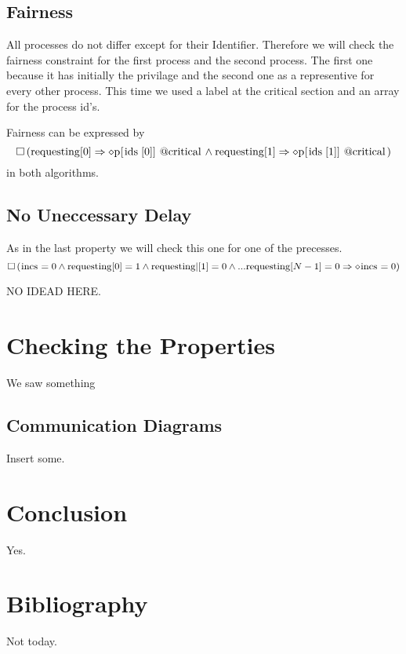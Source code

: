 \documentclass{llncs}
\begin{document}
\subsection{Fairness}

All processes do not differ except for their Identifier. Therefore we will check the fairness constraint for the first process and the second process.
The first one because it has initially the privilage and the second one as a representive for every other process.
This time we used a label at the critical section and an array for the process id's.

Fairness can be expressed by
\begin{equation}
    \square \left( \text{\lstinline|requesting|}[0] \Rightarrow \diamond \text{\lstinline|p[ids[0]]@critical|} 
    \land \text{\lstinline|requesting|}[1] \Rightarrow \diamond \text{\lstinline|p[ids[1]]@critical|}\right)
\end{equation}
in both algorithms.

\subsection{No Uneccessary Delay}

As in the last property we will check this one for one of the precesses.
\begin{equation}
    \square \left( \text{\lstinline|incs|}=0 \land \text{\lstinline|requesting|}[0] = 1 \land \text{requesting|}[1] = 0\land ... \text{\lstinline|requesting|}[N-1] = 0 
    \Rightarrow \diamond \text{\lstinline|incs|}=0\right)
\end{equation}

NO IDEAD HERE.

\section{Checking the Properties}

We saw something

\subsection{Communication Diagrams}

Insert some.

\section{Conclusion}

Yes.

\section{Bibliography}

Not today.
\end{document}
